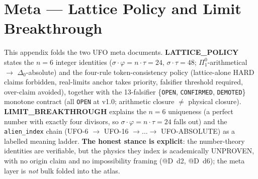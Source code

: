 \section{Meta --- Lattice Policy and Limit Breakthrough}
\label{app:meta}

This appendix folds the two UFO meta documents.
\textbf{LATTICE\_POLICY} states the $n\!=\!6$ integer identities
($\sigma\!\cdot\!\varphi=n\!\cdot\!\tau=24$,
$\sigma\!\cdot\!\tau=48$; $\Pi^0_1$-arithmetical $\to$
$\Delta_0$-absolute) and the four-rule token-consistency policy
(lattice-alone HARD claims forbidden, real-limits anchor takes priority,
falsifier threshold required, over-claim avoided), together with the
13-falsifier \{\texttt{OPEN}, \texttt{CONFIRMED}, \texttt{DEMOTED}\}
monotone contract (all \texttt{OPEN} at v1.0; arithmetic closure
$\ne$ physical closure). \textbf{LIMIT\_BREAKTHROUGH} explains the
$n\!=\!6$ uniqueness (a perfect number with exactly four divisors, so
$\sigma\!\cdot\!\varphi=n\!\cdot\!\tau=24$ falls out) and the
\verb|alien_index| chain (UFO-6 $\to$ UFO-16 $\to\dots\to$
UFO-ABSOLUTE) as a labelled meaning ladder. \textbf{The honest stance is
explicit}: the number-theory identities are verifiable, but the physics
they index is academically UNPROVEN, with no origin claim and no
impossibility framing (@D~d2, @D~d6); the meta layer is \emph{not} bulk
folded into the atlas.

